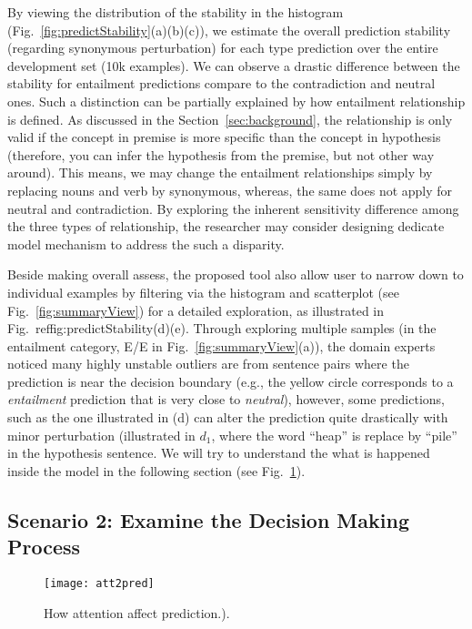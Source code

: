 By viewing the distribution of the stability in the histogram (Fig.~\ref{fig:predictStability}(a)(b)(c)), we estimate the overall prediction stability (regarding synonymous perturbation) for each type prediction over the entire development set (10k examples).
%
We can observe a drastic difference between the stability for entailment predictions compare to the contradiction and neutral ones.
%
Such a distinction can be partially explained by how entailment relationship is defined. As discussed in the Section~\ref{sec:background}, the relationship is only valid if the concept in premise is more specific than the concept in hypothesis (therefore, you can infer the hypothesis from the premise, but not other way around). This means, we may change the entailment relationships simply by replacing nouns and verb by synonymous, whereas, the same does not apply for neutral and contradiction.
%
By exploring the inherent sensitivity difference among the three types of relationship, the researcher may consider designing dedicate model mechanism to address the such a disparity.

Beside making overall assess, the proposed tool also allow user to narrow down to individual examples by filtering via the histogram and scatterplot (see Fig.~\ref{fig:summaryView}) for a detailed exploration, as illustrated in Fig.~ref{fig:predictStability}(d)(e). 
%
Through exploring multiple samples (in the entailment category, E/E in Fig.~\ref{fig:summaryView}(a)), the domain experts noticed many highly unstable outliers are from sentence pairs where the prediction is near the decision boundary (e.g., the yellow circle corresponds to a \emph{entailment} prediction that is very close to \emph{neutral}), however, some predictions, such as the one illustrated in (d) can alter the prediction quite drastically with minor perturbation (illustrated in $d_1$, where the word ``heap'' is replace by ``pile'' in the hypothesis sentence. We will try to understand the what is happened inside the model in the following section (see Fig.~\ref{fig:att2pred}).

\subsection{Scenario 2: Examine the Decision Making Process}

\begin{figure}[htbp]
\centering
\vspace{-2mm}
 \texttt{[image: att2pred]}
 \caption{
How attention affect prediction.).
%
}
\label{fig:att2pred}
\end{figure}

